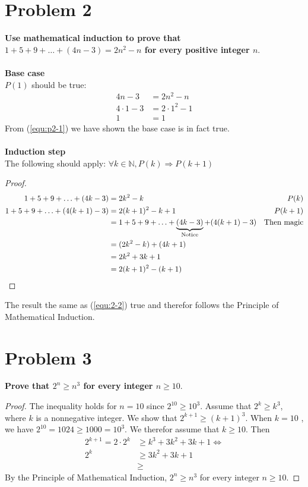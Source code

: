 \documentclass[english,11pt,a4paper]{article}
\begin{document}
\section*{Problem 2}
\textbf{Use mathematical induction to prove that $1+5+9+\ldots+(4n-3)=2n^2-n$ for every positive integer $n$}.
\\
\\
\textbf{Base case} 
\\
$P(1)$ should be true:
\begin{align}
4n-3 &= 2n^2-n \\
4\cdot 1-3 &= 2\cdot 1^2-1 \\
1 &= 1 \label{equ:p2-1}
\end{align}
From (\ref{equ:p2-1}) we have shown the base case is in fact true.
\\
\\
\textbf{Induction step}
\\
The following should apply: $\forall k \in \mathbb{N}, P(k) \Rightarrow P(k+1)$
\begin{proof}
\begin{align}
1+5+9+\ldots+(4k-3) &= 2k^2-k & P(k)\\
1+5+9+\ldots+(4(k+1)-3) &= 2(k+1)^2-k+1 & P(k+1) \label{equ:2-2}\\
	&= 1+5+9+\ldots+\underbrace{(4k-3)}_{\mathclap{\text{Notice}}}+(4(k+1)-3) &\text{Then magic} \\
	&=(2k^2-k)+(4k+1)\\
	&=2k^2+3k+1\\
	&=2(k+1)^2-(k+1) 
\end{align}
\end{proof}
The result the same as (\ref{equ:2-2}) true and therefor follows the Principle of Mathematical Induction.


\section*{Problem 3}
\textbf{Prove that $2^n \geq n^3$ for every integer $n \geq 10$}.
\begin{proof}
The inequality holds for $n=10$ since $2^{10} \geq 10^3 $. 
Assume that $2^k \geq k^3$, where $k$ is a nonnegative integer. We show that $2^{k+1} \geq (k+1)^3$. When $k=10$ , we have $2^{10} = 1024 \geq 1000 = 10^3$. We therefor assume that $k \geq 10$. Then
\begin{align}
2^{k+1} = 2\cdot 2^k &\geq k^3+3k^2+3k+1  \Leftrightarrow\\
2^k &\geq 3k^2+3k+1\\
	&\geq 
\end{align}
By the Principle of Mathematical Induction, $2^n \geq n^3$ for every integer $n \geq 10$.
\end{proof}
\end{document}
